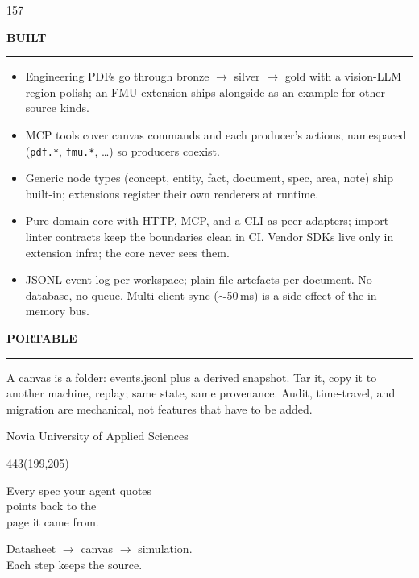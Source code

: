 \documentclass{article}
\newcommand{\panelhead}[1]{%
  \par\addvspace{5mm}%
  {\headingfont\bfseries\fontsize{14pt}{17pt}\selectfont
   \MakeUppercase{#1}\par}%
  \nopagebreak\vspace{1mm}%
  \textcolor{accent}{\rule{32mm}{1.5pt}}\par
  \vspace{1.5mm}%
}
\newcommand{\hl}[1]{\textcolor{accent}{#1}}
\newcommand{\arr}{\ensuremath{\rightarrow}}
\begin{document}
\begin{textblock}{157}
  \panelhead{Built}
  \begin{itemize}\setlength{\itemsep}{1.5pt}\setlength{\parsep}{1pt}\setlength{\leftmargin}{4mm}
    \item Engineering PDFs go through bronze \arr{} silver \arr{} gold with a vision-LLM region polish; an FMU extension ships alongside as an example for other source kinds.
    \item MCP tools cover canvas commands and each producer's actions, namespaced (\texttt{pdf.*}, \texttt{fmu.*}, \dots) so producers coexist.
    \item Generic node types (concept, entity, fact, document, spec, area, note) ship built-in; extensions register their own renderers at runtime.
    \item Pure domain core with HTTP, MCP, and a CLI as peer adapters; import-linter contracts keep the boundaries clean in CI. Vendor SDKs live only in extension infra; the core never sees them.
    \item JSONL event log per workspace; plain-file artefacts per document. No database, no queue. Multi-client sync ($\sim$50\,ms) is a side effect of the in-memory bus.
  \end{itemize}

  \panelhead{Portable}
  A canvas is a folder: events.jsonl plus a derived snapshot. Tar it, copy it to
  another machine, replay; same state, same provenance. Audit, time-travel, and
  migration are mechanical, not features that have to be added.

  \vfill
  {\color{panelmuted}\fontsize{8.5pt}{11pt}\selectfont
   Novia University of Applied Sciences\par}
\end{textblock}


\begin{textblock}{443}(199,205)
  \color{centertext}\centering
  {\bigfont\fontsize{72pt}{86pt}\selectfont
   Every spec your agent quotes\\
   points back to the\\
   \hl{page it came from}.\par}
  \vspace{10mm}
  {\headingfont\fontsize{22pt}{28pt}\selectfont
   Datasheet \arr{} canvas \arr{} simulation.\\
   Each step keeps the source.\par}
\end{textblock}
\end{document}
